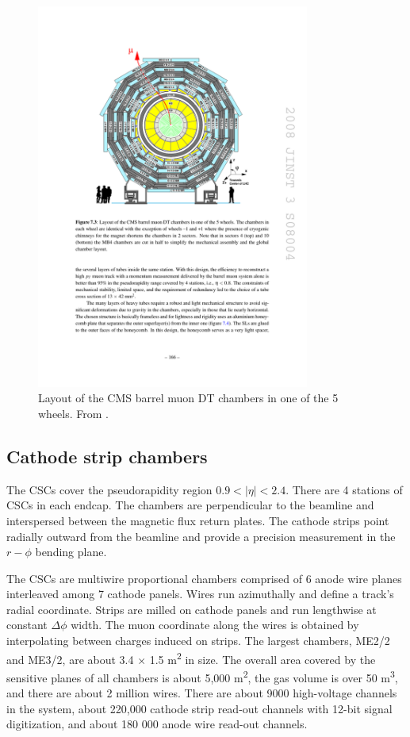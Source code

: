 \begin{figure}[hbtp]
\centering
\includegraphics[width=0.8\textwidth]{figures/cms_drifttubes_slice.pdf}
\caption{ Layout of the CMS barrel muon DT chambers in one of the 5 wheels. From \cite{Chatrchyan:2008aa}.}
\label{fig:dt_barrel}
\end{figure}

\subsection{Cathode strip chambers}
The CSCs cover the pseudorapidity region $0.9<|\eta|<2.4$.
There are 4 stations of CSCs in each endcap.
The chambers are perpendicular to the beamline and interspersed between the magnetic flux return plates.
The cathode strips point radially outward from the beamline and provide a precision measurement in the $r-\phi$ bending plane.

The CSCs are multiwire proportional chambers comprised of 6 anode wire planes interleaved
among 7 cathode panels. Wires run azimuthally and define a track’s radial coordinate.
Strips are milled on cathode panels and run lengthwise at constant $\Delta\phi$ width. 
The muon coordinate along the wires is obtained by interpolating between charges induced on strips.
The largest chambers, ME2/2 and ME3/2, are about 3.4 × 1.5 m\textsuperscript{2} in size.
The overall area covered by the sensitive planes of all chambers is about 5,000 m\textsuperscript{2},
the gas volume is over 50 m\textsuperscript{3}, and there are about 2 million wires.
There are about 9000 high-voltage channels in the system, 
about 220,000 cathode strip read-out channels with 12-bit signal digitization,
and about 180 000 anode wire read-out channels.

